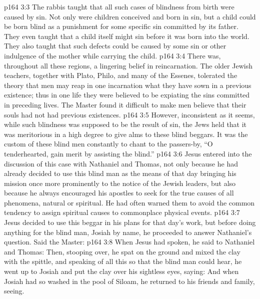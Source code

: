 \vs p164 3:3 \pc The rabbis taught that all such cases of blindness from birth were caused by sin. Not only were children conceived and born in sin, but a child could be born blind as a punishment for some specific sin committed by its father. They even taught that a child itself might sin before it was born into the world. They also taught that such defects could be caused by some sin or other indulgence of the mother while carrying the child.
\vs p164 3:4 There was, throughout all these regions, a lingering belief in reincarnation. The older Jewish teachers, together with Plato, Philo, and many of the Essenes, tolerated the theory that men may reap in one incarnation what they have sown in a previous existence; thus in one life they were believed to be expiating the sins committed in preceding lives. The Master found it difficult to make men believe that their souls had not had previous existences.
\vs p164 3:5 However, inconsistent as it seems, while such blindness was supposed to be the result of sin, the Jews held that it was meritorious in a high degree to give alms to these blind beggars. It was the custom of these blind men constantly to chant to the passers\hyp{}by, “O tenderhearted, gain merit by assisting the blind.”
\vs p164 3:6 \pc Jesus entered into the discussion of this case with Nathaniel and Thomas, not only because he had already decided to use this blind man as the means of that day bringing his mission once more prominently to the notice of the Jewish leaders, but also because he always encouraged his apostles to seek for the true causes of all phenomena, natural or spiritual. He had often warned them to avoid the common tendency to assign spiritual causes to commonplace physical events.
\vs p164 3:7 Jesus decided to use this beggar in his plans for that day’s work, but before doing anything for the blind man, Josiah by name, he proceeded to answer Nathaniel’s question. Said the Master: 
\vs p164 3:8 When Jesus had spoken, he said to Nathaniel and Thomas:  Then, stooping over, he spat on the ground and mixed the clay with the spittle, and speaking of all this so that the blind man could hear, he went up to Josiah and put the clay over his sightless eyes, saying:  And when Josiah had so washed in the pool of Siloam, he returned to his friends and family, seeing.
